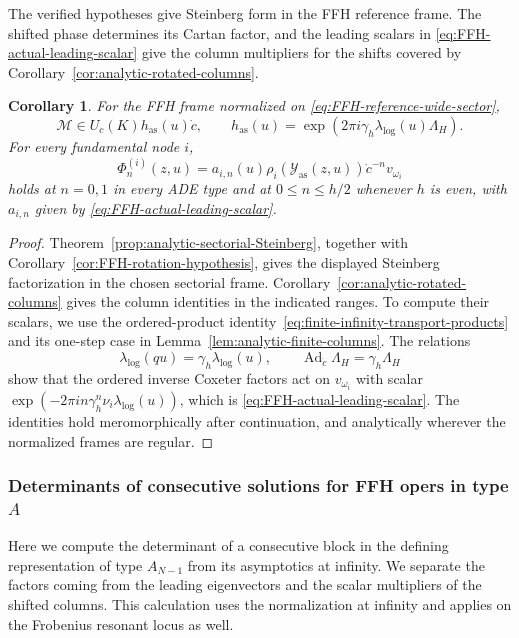 \documentclass[11pt,leqno]{amsart}
\numberwithin{equation}{section}
\theoremstyle{plain}
\newtheorem{corollary}[theorem]{Corollary}
\theoremstyle{definition}
\theoremstyle{plain}
\theoremstyle{definition}
\theoremstyle{remark}
\begin{document}
The verified hypotheses give Steinberg form in the FFH reference frame.  The shifted phase determines its Cartan factor, and the leading scalars in \eqref{eq:FFH-actual-leading-scalar} give the column multipliers for the shifts covered by Corollary~\ref{cor:analytic-rotated-columns}.
\begin{corollary}\label{lem:FFH-common-reference-sector}
For the FFH frame normalized on \eqref{eq:FFH-reference-wide-sector},
\[
 \mathscr M\in U_c(K)h_{\mathrm{as}}(u)\dot c,\qquad
 h_{\mathrm{as}}(u)
 =\exp\!\left(2\pi i\gamma_h\lambda_{\log}(u)\Lambda_H\right).
\]
For every fundamental node $i$,
\[
 \Phi_n^{(i)}(z,u)
 =a_{i,n}(u)\rho_i(\mathcal Y_{\mathrm{as}}(z,u))
       \dot c^{-n}v_{\omega_i}
\]
holds at $n=0,1$ in every ADE type and at $0\le n\le h/2$ whenever $h$ is even, with $a_{i,n}$ given by \eqref{eq:FFH-actual-leading-scalar}.
\end{corollary}
\begin{proof}
Theorem~\ref{prop:analytic-sectorial-Steinberg}, together with Corollary~\ref{cor:FFH-rotation-hypothesis}, gives the displayed Steinberg factorization in the chosen sectorial frame.  Corollary~\ref{cor:analytic-rotated-columns} gives the column identities in the indicated ranges.  To compute their scalars, we use the ordered-product identity~\eqref{eq:finite-infinity-transport-products} and its one-step case in Lemma~\ref{lem:analytic-finite-columns}.  The relations
\[
 \lambda_{\log}(qu)=\gamma_h\lambda_{\log}(u),\qquad
 \operatorname{Ad}_{\dot c}\Lambda_H=\gamma_h\Lambda_H
\]
show that the ordered inverse Coxeter factors act on $v_{\omega_i}$ with scalar
$\exp(-2\pi in\gamma_h^n\nu_i\lambda_{\log}(u))$, which is \eqref{eq:FFH-actual-leading-scalar}.  The identities hold meromorphically after continuation, and analytically wherever the normalized frames are regular.
\end{proof}





\subsubsection{Determinants of consecutive solutions for FFH opers in type $A$}\label{sec:FFH-typeA-basis}
Here we compute the determinant of a consecutive block in the defining representation of type $A_{N-1}$ from its asymptotics at infinity.  We separate the factors coming from the leading eigenvectors and the scalar multipliers of the shifted columns.  This calculation uses the normalization at infinity and applies on the Frobenius resonant locus as well.
\end{document}
